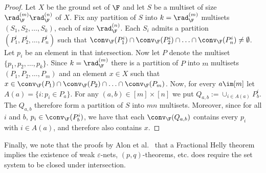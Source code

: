 \begin{proof}
  Let $X$ be the ground set of $\F$ and let $S$ be a multiset of size $\rad^{(m)}_\F\rad^{(n)}_\F$ of $X$. Fix any partition of $S$ into $k = \rad^{(m)}_\F$ multisets $(S_1, S_2, \ldots, S_k)$, each of size $\rad^{(n)}_\F$. Each $S_i$ admits a partition $(P^i_1, P^i_2, \ldots, P^i_n)$ such that $\conv_{\F}(P^i_1) \cap \conv_{\F}(P^i_2) \cap \ldots  \cap \conv_{\F}(P^i_n)\neq \emptyset$. Let $p_i$ be an element in that intersection. Now let $P$ denote the multiset $\{p_1, p_2, \ldots, p_k\}$. Since $k = \rad^{(m)}_\F$ there is a partition of $P$ into $m$ multisets $(P_1,P_2, \ldots, P_m)$ and an element $x \in X$ such that $x \in \conv_{\F}(P_1) \cap \conv_{\F}(P_2) \cap \ldots  \cap \conv_{\F}(P_m)$. Now, for every $a \im [m]$ let $A(a) = \{i \colon p_i \in P_a\}$. For any $(a,b) \in [m]\times [n]$ we put $Q_{a,b} := \cup_{i \in A(a)} P^i_b$. The $Q_{a,b}$ therefore form a partition of $S$ into $mn$ multisets. Moreover, since for all $i$ and $b$, $p_i\in \conv_{\F}(P_b^i)$, we have that each $\conv_\F(Q_{a,b})$ contains every $p_i$ with $i \in A(a)$, and therefore also contains $x$.
\end{proof}
%
\bigskip
%
Finally, we note that the proofs by Alon et al.~\cite{transversal-hypergraph} that a Fractional Helly theorem implies the existence of weak $\varepsilon$-nets, $(p,q)$-theorems, etc. does require the set system to be closed under intersection.
%
%
